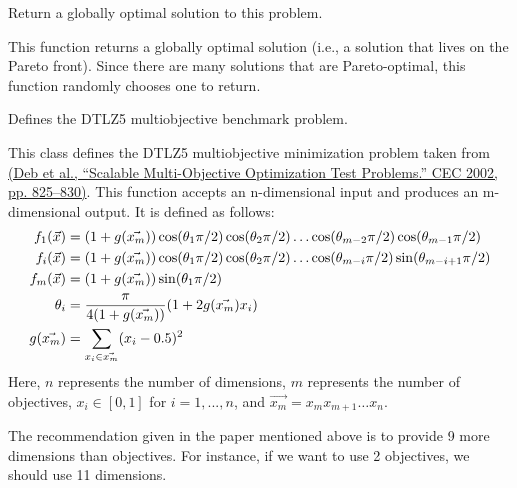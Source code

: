 \documentclass[letterpaper,10pt,english]{sphinxmanual}
\begin{document}
\begin{fulllineitems}
\begin{fulllineitems}
\label{reference:inspyred.benchmarks.DTLZ4.global_optimum}
Return a globally optimal solution to this problem.

This function returns a globally optimal solution (i.e., a 
solution that lives on the Pareto front). Since there are many
solutions that are Pareto-optimal, this function randomly 
chooses one to return.

\end{fulllineitems}


\end{fulllineitems}


\begin{fulllineitems}
\label{reference:inspyred.benchmarks.DTLZ5}
Defines the DTLZ5 multiobjective benchmark problem.

This class defines the DTLZ5 multiobjective minimization problem
taken from \href{http://www.tik.ee.ethz.ch/sop/download/supplementary/testproblems/dtlz1/index.php}{(Deb et al., ``Scalable Multi-Objective Optimization Test Problems.''
CEC 2002, pp. 825--830)}.
This function accepts an n-dimensional input and produces an m-dimensional output.
It is defined as follows:
\begin{gather}
\begin{split}f_1(\vec{x}) &= (1 + g(\vec{x_m}))\cos(\theta_1 \pi/2)\cos(\theta_2 \pi/2)\dots\cos(\theta_{m-2} \pi/2)\cos(\theta_{m-1} \pi/2) \\
f_i(\vec{x}) &= (1 + g(\vec{x_m}))\cos(\theta_1 \pi/2)\cos(\theta_2 \pi/2)\dots\cos(\theta_{m-i} \pi/2)\sin(\theta_{m-i+1} \pi/2) \\
f_m(\vec{x}) &= (1 + g(\vec{x_m}))\sin(\theta_1 \pi/2) \\
\theta_i     &= \frac{\pi}{4(1+g(\vec{x_m}))}(1 + 2g(\vec{x_m}) x_i) \\
g(\vec{x_m}) &= \sum_{x_i \in \vec{x_m}}(x_i - 0.5)^2 \\\end{split}\notag
\end{gather}
Here, $n$ represents the number of dimensions, $m$ represents the
number of objectives, $x_i \in [0, 1]$ for $i=1,...,n$, and 
$\vec{x_m} = x_m x_{m+1} \dots x_{n}.$

The recommendation given in the paper mentioned above is to provide 9 more
dimensions than objectives. For instance, if we want to use 2 objectives, we
should use 11 dimensions.


\end{fulllineitems}
\end{document}
